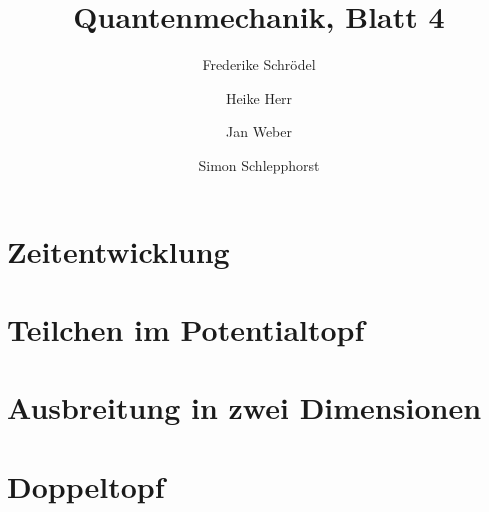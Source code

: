 \documentclass[11pt, ngerman, fleqn, DIV=15, headinclude]{scrartcl}
\title{Quantenmechanik, Blatt 4}
\author{
    Frederike Schrödel \and Heike Herr \and Jan Weber \and Simon Schlepphorst
}
\begin{document}
\maketitle

\section{Zeitentwicklung}

\section{Teilchen im Potentialtopf}

\section{Ausbreitung in zwei Dimensionen}

\section{Doppeltopf}
\end{document}
